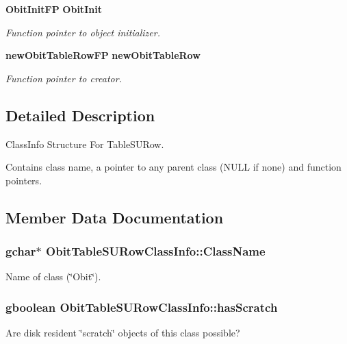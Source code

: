 \begin{CompactItemize}
{\bf Obit\-Init\-FP} {\bf Obit\-Init}
\begin{CompactList}\small\item\em Function pointer to object initializer. \item\end{CompactList}\item 
{\bf new\-Obit\-Table\-Row\-FP} {\bf new\-Obit\-Table\-Row}
\begin{CompactList}\small\item\em Function pointer to creator. \item\end{CompactList}\end{CompactItemize}


\subsection{Detailed Description}
Class\-Info Structure For Table\-SURow. 

Contains class name, a pointer to any parent class (NULL if none) and function pointers. 



\subsection{Member Data Documentation}
\subsubsection{\setlength{\rightskip}{0pt plus 5cm}gchar$\ast$ {\bf Obit\-Table\-SURow\-Class\-Info::Class\-Name}}\label{structObitTableSURowClassInfo_o2}


Name of class (\char`\"{}Obit\char`\"{}). 

\subsubsection{\setlength{\rightskip}{0pt plus 5cm}gboolean {\bf Obit\-Table\-SURow\-Class\-Info::has\-Scratch}}\label{structObitTableSURowClassInfo_o1}


Are disk resident \char`\"{}scratch\char`\"{} objects of this class possible? 

